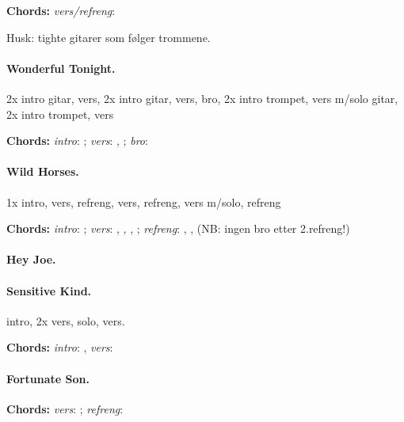 \documentclass[%
twoside,                 %
final,                   %
10pt]{article}
\begin{document}
\textbf{Chords:} \emph{vers/refreng}: 

Husk: tighte gitarer som følger trommene.


\paragraph{Wonderful Tonight.}
2x intro gitar, vers, 2x intro gitar, vers, bro, 2x intro trompet, vers m/solo gitar, 2x intro trompet, vers

\textbf{Chords:} \emph{intro}: ;
\emph{vers}:
, ;
\emph{bro}: 




\paragraph{Wild Horses.}
1x intro, vers, refreng, vers, refreng, vers m/solo, refreng

\textbf{Chords:} \emph{intro}: ;
\emph{vers}: , , , ;
\emph{refreng}: , , 
(NB: ingen bro etter 2.refreng!)





\paragraph{Hey Joe.}
\paragraph{Sensitive Kind.}
intro, 2x vers, solo, vers.

\textbf{Chords:} \emph{intro}: , \emph{vers}: 





\paragraph{Fortunate Son.}


\textbf{Chords:} \emph{vers}: ; \emph{refreng}: 
\end{document}
